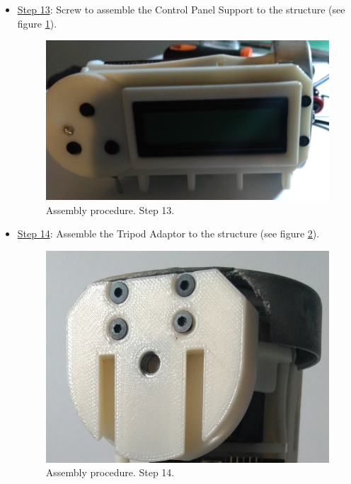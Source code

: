 \documentclass[12pt,letterpaper]{article}
\numberwithin{figure}{section}
\numberwithin{equation}{section}
\numberwithin{table}{section}
\begin{document}
\begin{itemize}
    \item \underline{Step 13}: Screw to assemble the Control Panel Support to the structure (see figure \ref{fig:53}).
    
    \begin{figure}[H]
        \centering
        \includegraphics[scale=0.5]{Figuras/figure_53.jpg}
        \caption{Assembly procedure. Step 13.}
        \label{fig:53}    
    \end{figure}
    
    \item \underline{Step 14}: Assemble the Tripod Adaptor to the structure (see figure \ref{fig:54}).
    
    \begin{figure}[H]
        \centering
        \includegraphics[scale=0.5]{Figuras/figure_54.jpg}
        \caption{Assembly procedure. Step 14.}
        \label{fig:54}    
    \end{figure}
    

\end{itemize}
\end{document}
